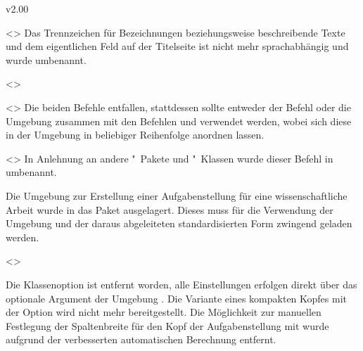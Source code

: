 \begin{Entity}{}
\begin{NoIndexDefault}
\begin{Cessations}{v2.00}
\begin{Cessation}
  {}
  <>
\printdeclarationlist
%
Das Trennzeichen für Bezeichnungen beziehungsweise beschreibende Texte und dem 
eigentlichen Feld auf der Titelseite ist nicht mehr sprachabhängig und wurde 
umbenannt.
\end{Cessation}

\begin{Cessation}
  {}
  <>
\begin{Cessation}
  {}
  <>
\printdeclarationlist
%
Die beiden Befehle entfallen, stattdessen sollte entweder der Befehl 
 oder die Umgebung  zusammen mit 
den Befehlen  und  verwendet werden, wobei 
sich diese in der Umgebung in beliebiger Reihenfolge anordnen lassen.
\end{Cessation}
\end{Cessation}

\begin{Cessation}
  {}
  <>
\printdeclarationlist
%
In Anlehnung an andere "~Pakete und "~Klassen wurde 
dieser Befehl in  umbenannt.
\end{Cessation}

\minisec{\taskname}
%
\begin{Entity}{}
Die Umgebung zur Erstellung einer Aufgabenstellung für eine wissenschaftliche 
Arbeit wurde in das Paket  ausgelagert. Dieses muss 
für die Verwendung der Umgebung  und der daraus abgeleiteten 
standardisierten Form zwingend geladen werden.

\begin{Cessation}
  {}
  <>
\begin{Cessation}
  {}
\begin{Cessation}
  {}
\printdeclarationlist
%
Die Klassenoption  ist entfernt worden, alle Einstellungen 
erfolgen direkt über das optionale Argument der Umgebung . 
Die Variante eines kompakten Kopfes mit der Option  wird 
nicht mehr bereitgestellt. Die Möglichkeit zur manuellen Festlegung der 
Spaltenbreite für den Kopf der Aufgabenstellung mit  wurde 
aufgrund der verbesserten automatischen Berechnung entfernt.
\end{Cessation}
\end{Cessation}
\end{Cessation}


\end{Entity}
\end{Cessations}
\end{NoIndexDefault}
\end{Entity}
